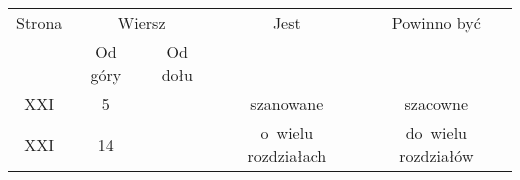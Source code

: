 \documentclass[a4paper,11pt]{article}
\numberwithin{equation}{section}
\begin{document}








































\newpage



\begin{center}

  \begin{tabular}{|c|c|c|c|c|}
    \hline
    Strona & \multicolumn{2}{c|}{Wiersz} & Jest
                              & Powinno być \\ \cline{2-3}
    & Od góry & Od dołu & & \\
    \hline
    XXI & \hphantom{0}5 & & szanowane & szacowne \\
    XXI & 14 & & o~wielu rozdziałach & do~wielu rozdziałów \\
    \hline
  \end{tabular}

\end{center}

\VerSpaceTwo
\end{document}
